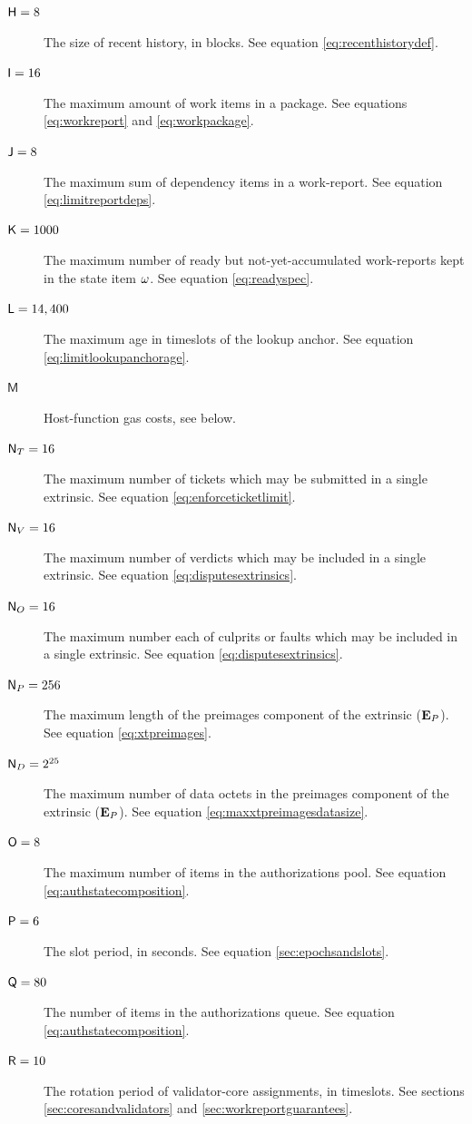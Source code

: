 \begin{description}
  \item[$\mathsf{H} = 8$] The size of recent history, in blocks. See equation \ref{eq:recenthistorydef}.
  \item[$\mathsf{I} = 16$] The maximum amount of work items in a package. See equations \ref{eq:workreport} and \ref{eq:workpackage}.
  \item[$\mathsf{J} = 8$] The maximum sum of dependency items in a work-report. See equation \ref{eq:limitreportdeps}.
  \item[$\mathsf{K} = 1000$] The maximum number of ready but not-yet-accumulated work-reports kept in the state item $\omega$. See equation \ref{eq:readyspec}.
  \item[$\mathsf{L} = 14,400$] The maximum age in timeslots of the lookup anchor. See equation \ref{eq:limitlookupanchorage}.
  \item[$\mathsf{M}$] Host-function gas costs, see below.
  \item[$\mathsf{N}_T = 16$] The maximum number of tickets which may be submitted in a single extrinsic. See equation \ref{eq:enforceticketlimit}.
  \item[$\mathsf{N}_V = 16$] The maximum number of verdicts which may be included in a single extrinsic. See equation \ref{eq:disputesextrinsics}.
  \item[$\mathsf{N}_O = 16$] The maximum number each of culprits or faults which may be included in a single extrinsic. See equation \ref{eq:disputesextrinsics}.
  \item[$\mathsf{N}_P = 256$] The maximum length of the preimages component of the extrinsic ($\mathbf{E}_P$). See equation \ref{eq:xtpreimages}.
  \item[$\mathsf{N}_D = 2^{25}$] The maximum number of data octets in the preimages component of the extrinsic ($\mathbf{E}_P$). See equation \ref{eq:maxxtpreimagesdatasize}.
  \item[$\mathsf{O} = 8$] The maximum number of items in the authorizations pool. See equation \ref{eq:authstatecomposition}.
  \item[$\mathsf{P} = 6$] The slot period, in seconds. See equation \ref{sec:epochsandslots}.
  \item[$\mathsf{Q} = 80$] The number of items in the authorizations queue. See equation \ref{eq:authstatecomposition}.
  \item[$\mathsf{R} = 10$] The rotation period of validator-core assignments, in timeslots. See sections \ref{sec:coresandvalidators} and \ref{sec:workreportguarantees}.

\end{description}
